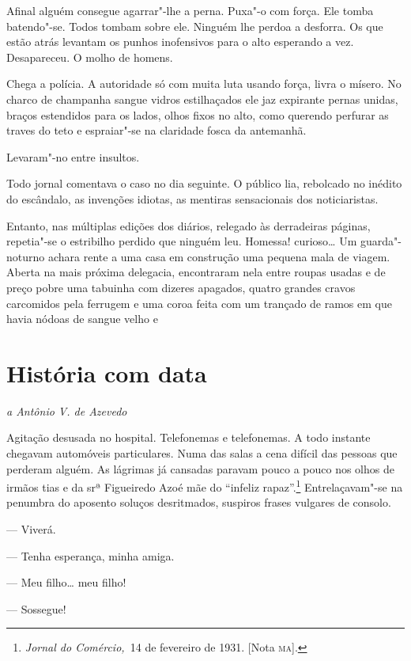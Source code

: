 Afinal alguém consegue agarrar"-lhe a perna. Puxa"-o com força. Ele tomba
batendo"-se. Todos tombam sobre ele. Ninguém lhe perdoa a desforra. Os
que estão atrás levantam os punhos inofensivos para o alto esperando a
vez. Desapareceu. O molho de homens.

Chega a polícia. A autoridade só com muita luta usando força, livra o
mísero. No charco de champanha sangue vidros estilhaçados ele jaz
expirante pernas unidas, braços estendidos para os lados, olhos fixos no
alto, como querendo perfurar as traves do teto e espraiar"-se na
claridade fosca da antemanhã.

Levaram"-no entre insultos.

\asterisc

Todo jornal comentava o caso no dia seguinte. O público lia, rebolcado
no inédito do escândalo, as invenções idiotas, as mentiras sensacionais
dos noticiaristas.

Entanto, nas múltiplas edições dos diários, relegado às derradeiras
páginas, repetia"-se o estribilho perdido que ninguém leu. Homessa!
curioso\ldots{} Um guarda"-noturno achara rente a uma casa em construção uma
pequena mala de viagem. Aberta na mais próxima delegacia, encontraram
nela entre roupas usadas e de preço pobre uma tabuinha com dizeres
apagados, quatro grandes cravos carcomidos pela ferrugem e uma coroa
feita com um trançado de ramos em que havia nódoas de sangue velho e



\chapter{História com data}

\hfill{}\emph{a Antônio V. de Azevedo}\bigskip

\noindent{}Agitação desusada no hospital. Telefonemas e telefonemas. A todo
instante chegavam automóveis particulares. Numa das salas a cena difícil
das pessoas que perderam alguém. As lágrimas já cansadas paravam pouco a
pouco nos olhos de irmãos tias e da srª Figueiredo Azoé mãe do ``infeliz
rapaz''.\footnote{\emph{Jornal do Comércio,~}14 de fevereiro de 1931.
  {[}Nota \textsc{ma}{]}.} Entrelaçavam"-se na penumbra do aposento soluços
desritmados, suspiros frases vulgares de consolo.

--- Viverá.

--- Tenha esperança, minha amiga.

--- Meu filho\ldots{} meu filho!

--- Sossegue!

